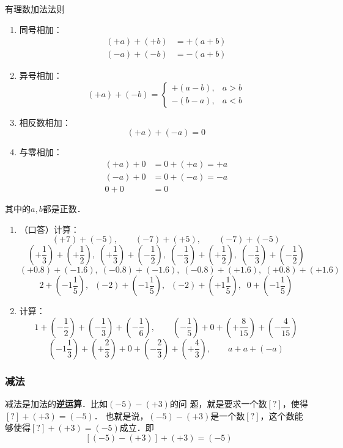 \begin{blk}{有理数加法法则}
	\begin{enumerate}
		\item 同号相加：
		\[\begin{split}
		(+a)+(+b)&=+(a+b)\\
		(-a)+(-b)&=-(a+b)
		\end{split}\]
		\item 异号相加：
		\[(+a)+(-b)=\begin{cases}
		+(a-b),& a>b\\
		-(b-a),&a<b
		\end{cases}\]
		\item 相反数相加：
		\[(+a)+(-a)=0\]
		\item 与零相加：
		\[\begin{split}
		(+a)+0&=0+(+a)=+a\\
		(-a)+0&=0+(-a)=-a\\
		0+0&=0
		\end{split}\]
	\end{enumerate}    
	其中的$a,b$都是正数．
\end{blk}

\begin{ex}
	\begin{enumerate}
		\item （口答）计算：
		\[(+7)+(-5),\qquad (-7)+(+5),\qquad (-7)+(-5) \]
		\[\left(+\frac{1}{3}\right)+\left(+\frac{1}{2}\right),\; \left(+\frac{1}{3}\right)+\left(-\frac{1}{2}\right),\; \left(-\frac{1}{3}\right)+\left(+\frac{1}{2}\right) ,\; \left(-\frac{1}{3}\right)+\left(-\frac{1}{2}\right) \]
		\[(+0.8)+(-1.6),\; (-0.8)+(-1.6),\; (-0.8)+(+1.6),\; (+0.8)+(+1.6) \]
		\[2+\left(-1\frac{1}{5}\right),\;\;(-2)+\left(-1\frac{1}{5}\right),\;\;(-2)+\left(+1\frac{1}{5}\right),\;\; 0+\left(-1\frac{1}{5}\right)\]
		\item 计算：
		\[1+\left(-\frac{1}{2}\right)+\left(-\frac{1}{3}\right)+\left(-\frac{1}{6}\right),\qquad \left(-\frac{1}{5}\right)+0+\left(+\frac{8}{15}\right)+\left(-\frac{4}{15}\right) \]
		\[\left(-1\frac{1}{3}\right)+\left(+\frac{2}{3}\right)+0+\left(-\frac{2}{3}\right)+\left(+\frac{4}{3}\right),\qquad a+a+(-a) \]
	\end{enumerate}
\end{ex}

\subsubsection{减法}

减法是加法的\textbf{逆运算}．比如$(-5)-(+3)$的问
题，就是要求一个数$[?]$，使得$[?]+(+3)=(-5)$．
也就是说，$(-5)-(+ 3)$是一个数$[?]$，这个数能
够使得$[?]+(+3)=(-5)$成立．即
$$[(-5)-(+3) ]+(+3)=(-5)$$

